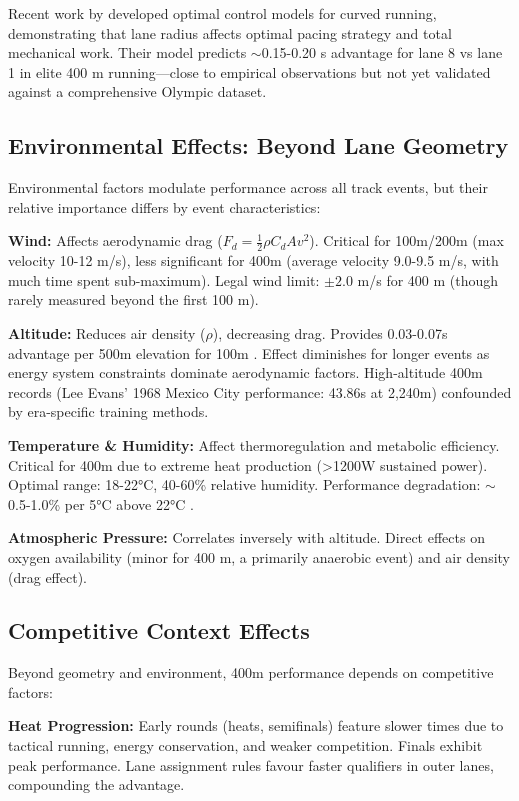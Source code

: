 \documentclass[12pt]{article}
\begin{document}
Recent work by \citet{Aftalion2020} developed optimal control models for curved running, demonstrating that lane radius affects optimal pacing strategy and total mechanical work. Their model predicts $\sim$0.15-0.20 s advantage for lane 8 vs lane 1 in elite 400 m running—close to empirical observations but not yet validated against a comprehensive Olympic dataset.

\subsection{Environmental Effects: Beyond Lane Geometry}

Environmental factors modulate performance across all track events, but their relative importance differs by event characteristics:

\textbf{Wind:} Affects aerodynamic drag ($F_d = \frac{1}{2} \rho C_d A v^2$). Critical for 100m/200m (max velocity 10-12 m/s), less significant for 400m (average velocity 9.0-9.5 m/s, with much time spent sub-maximum). Legal wind limit: $\pm 2.0$ m/s for 400 m (though rarely measured beyond the first 100 m).

\textbf{Altitude:} Reduces air density ($\rho$), decreasing drag. Provides 0.03-0.07s advantage per 500m elevation for 100m \citep{Ward-Smith1999}. Effect diminishes for longer events as energy system constraints dominate aerodynamic factors. High-altitude 400m records (Lee Evans' 1968 Mexico City performance: 43.86s at 2,240m) confounded by era-specific training methods.

\textbf{Temperature \& Humidity:} Affect thermoregulation and metabolic efficiency. Critical for 400m due to extreme heat production (>1200W sustained power). Optimal range: 18-22°C, 40-60\% relative humidity. Performance degradation: $\sim$0.5-1.0\% per 5°C above 22°C \citep{Ely2007}.

\textbf{Atmospheric Pressure:} Correlates inversely with altitude. Direct effects on oxygen availability (minor for 400 m, a primarily anaerobic event) and air density (drag effect).

\subsection{Competitive Context Effects}

Beyond geometry and environment, 400m performance depends on competitive factors:

\textbf{Heat Progression:} Early rounds (heats, semifinals) feature slower times due to tactical running, energy conservation, and weaker competition. Finals exhibit peak performance. Lane assignment rules favour faster qualifiers in outer lanes, compounding the advantage.
\end{document}
